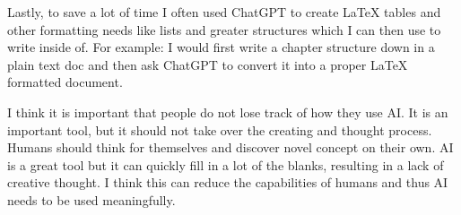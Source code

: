 Lastly, to save a lot of time I often used ChatGPT to create LaTeX tables and other formatting needs like lists and greater structures which I can then use to write inside of. For example: I would first write a chapter structure down in a plain text doc and then ask ChatGPT to convert it into a proper LaTeX formatted document.

I think it is important that people do not lose track of how they use AI. It is an important tool, but it should not take over the creating and thought process. Humans should think for themselves and discover novel concept on their own. AI is a great tool but it can quickly fill in a lot of the blanks, resulting in a lack of creative thought. I think this can reduce the capabilities of humans and thus AI needs to be used meaningfully.
